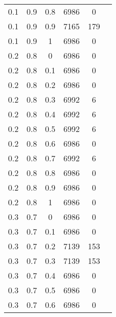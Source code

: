 \begin{table}
\begin{minipage}[h!]{0.10\hsize}
\begin{center}
{\begin{tabular}{|c@{\hspace{5mm}}|c@{\hspace{5mm}}|c@{\hspace{5mm}}|c@{\hspace{5mm}}|c@{\hspace{5mm}}|c|}
                    0.1  & 0.9  & 0.8  & 6986  & 0     \\
                    0.1  & 0.9  & 0.9  & 7165  & 179   \\
                    0.1  & 0.9  & 1    & 6986  & 0     \\
                    0.2  & 0.8  & 0    & 6986  & 0     \\
                    0.2  & 0.8  & 0.1  & 6986  & 0     \\
                    0.2  & 0.8  & 0.2  & 6986  & 0     \\
                    0.2  & 0.8  & 0.3  & 6992  & 6     \\
                    0.2  & 0.8  & 0.4  & 6992  & 6     \\
                    0.2  & 0.8  & 0.5  & 6992  & 6     \\
                    0.2  & 0.8  & 0.6  & 6986  & 0     \\
                    0.2  & 0.8  & 0.7  & 6992  & 6     \\
                    0.2  & 0.8  & 0.8  & 6986  & 0     \\
                    0.2  & 0.8  & 0.9  & 6986  & 0     \\
                    0.2  & 0.8  & 1    & 6986  & 0     \\
                    0.3  & 0.7  & 0    & 6986  & 0     \\
                    0.3  & 0.7  & 0.1  & 6986  & 0     \\
                    0.3  & 0.7  & 0.2  & 7139  & 153   \\
                    0.3  & 0.7  & 0.3  & 7139  & 153   \\
                    0.3  & 0.7  & 0.4  & 6986  & 0     \\
                    0.3  & 0.7  & 0.5  & 6986  & 0     \\
                    0.3  & 0.7  & 0.6  & 6986  & 0     \\
                    \hline
                \end{tabular}}
                \label{tab:log2}
        \end{center}
    \end{minipage}
    \hfill
    \begin{minipage}[!h]{0.50\hsize}\centering
        \begin{center}
\end{center}
\end{minipage}
\end{table}
